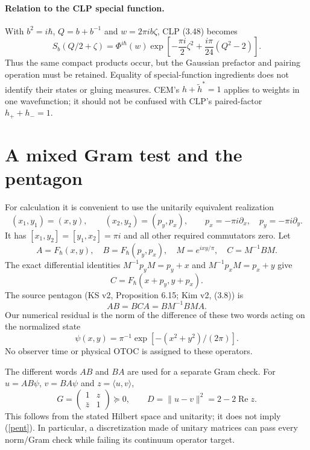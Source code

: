 \documentclass[11pt,a4paper]{article}
\newcommand{\F}{F_\hbar}
\begin{document}
\paragraph{Relation to the CLP special function.}
With $b^2=i\hbar$, $Q=b+b^{-1}$ and $w=2\pi ib\zeta$,
CLP (3.48) becomes
\begin{equation}
 S_b(Q/2+\zeta)=
 \Phi^{i\hbar}(w)
 \exp\left[-\frac{\pi i}{2}\zeta^2+
                  \frac{i\pi}{24}(Q^2-2)\right].
\end{equation}
Thus the same compact products occur, but the Gaussian prefactor
and pairing operation must be retained. Equality of special-function
ingredients does not identify their states or gluing measures.
CEM's $h+\tilde h^*=1$ applies to weights in one wavefunction;
it should not be confused with CLP's paired-factor $h_++h_-=1$.
\newpage

\section{A mixed Gram test and the pentagon}
For calculation it is convenient to use the unitarily equivalent
realization
\begin{equation}
 (x_1,y_1)=(x,y),\qquad (x_2,y_2)=(p_y,p_x),
 \qquad p_x=-\pi i\partial_x,\quad p_y=-\pi i\partial_y .
\end{equation}
It has $[x_1,y_2]=[y_1,x_2]=\pi i$ and all other required
commutators zero. Let
\begin{equation}
 A=\F(x,y),\quad B=\F(p_y,p_x),\quad
 M=e^{ixy/\pi},\quad C=M^{-1}BM.
\end{equation}
The exact differential identities
$M^{-1}p_yM=p_y+x$ and $M^{-1}p_xM=p_x+y$ give
\begin{equation}
 C=\F(x+p_y,y+p_x).
\end{equation}
The source pentagon (KS v2, Proposition 6.15; Kim v2, (3.8)) is
\begin{equation}
 AB=BCA=BM^{-1}BMA. \label{pent}
\end{equation}
Our numerical residual is the norm of the difference of these two
words acting on the normalized state
\begin{equation}
 \psi(x,y)=\pi^{-1}\exp[-(x^2+y^2)/(2\pi)] .
 \label{state}
\end{equation}
No observer time or physical OTOC is assigned to these operators.

The different words $AB$ and $BA$ are used for a separate Gram check.
For $u=AB\psi$, $v=BA\psi$ and $z=\langle u,v\rangle$,
\begin{equation}
 G=\begin{pmatrix}1&z\\\bar z&1\end{pmatrix}\succeq0,\qquad
 D=\|u-v\|^2=2-2\operatorname{Re}z .
\end{equation}
This follows from the stated Hilbert space and unitarity; it does not
imply (\ref{pent}). In particular, a discretization made of unitary
matrices can pass every norm/Gram check while failing its continuum
operator target.
\end{document}
